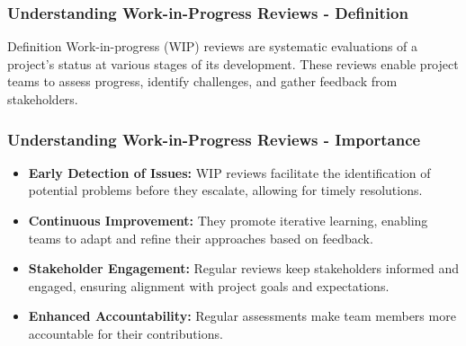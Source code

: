 \documentclass[aspectratio=169]{beamer}
\begin{document}
\begin{frame}[fragile]
    \frametitle{Understanding Work-in-Progress Reviews - Definition}
    
    \begin{block}{Definition}
        Work-in-progress (WIP) reviews are systematic evaluations of a project's status at various stages of its development. 
        These reviews enable project teams to assess progress, identify challenges, and gather feedback from stakeholders.
    \end{block}
\end{frame}

\begin{frame}[fragile]
    \frametitle{Understanding Work-in-Progress Reviews - Importance}
    
    \begin{itemize}
        \item \textbf{Early Detection of Issues:} WIP reviews facilitate the identification of potential problems before they escalate, allowing for timely resolutions.
        \item \textbf{Continuous Improvement:} They promote iterative learning, enabling teams to adapt and refine their approaches based on feedback.
        \item \textbf{Stakeholder Engagement:} Regular reviews keep stakeholders informed and engaged, ensuring alignment with project goals and expectations.
        \item \textbf{Enhanced Accountability:} Regular assessments make team members more accountable for their contributions.
    \end{itemize}
\end{frame}
\end{document}
